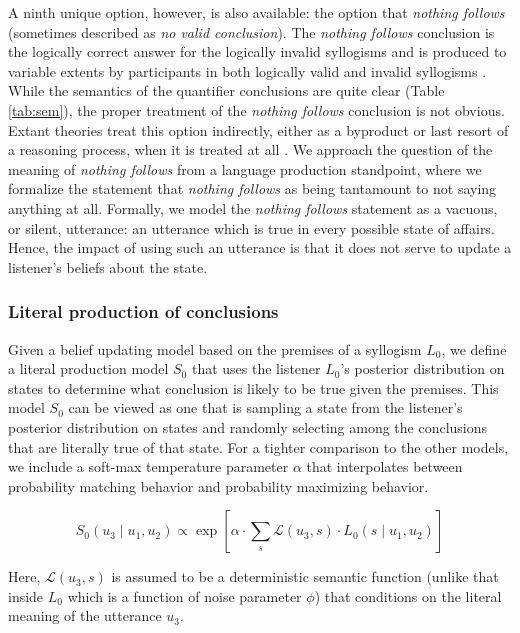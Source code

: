 \documentclass[floatsintext, man]{apa6}
\begin{document}
A ninth unique option, however, is also available: the option that \emph{nothing follows} (sometimes described as \emph{no valid conclusion}). 
The \emph{nothing follows} conclusion is the logically correct answer for the logically invalid syllogisms and is produced to variable extents by participants in both logically valid and invalid syllogisms \cite{Khemlani2012}.
While the semantics of the quantifier conclusions are quite clear (Table \ref{tab:sem}), the proper treatment of the \emph{nothing follows} conclusion is not obvious. 
Extant theories treat this option indirectly, either as a byproduct or last resort of a reasoning process, when it is treated at all \cite{ragni2019does, riesterer2020modeling}.
We approach the question of the meaning of \emph{nothing follows} from a language production standpoint, where we formalize the statement that \emph{nothing follows} as being tantamount to not saying anything at all. 
Formally, we model the \emph{nothing follows} statement as a vacuous, or silent, utterance: an utterance which is true in every possible state of affairs.
Hence, the impact of using such an utterance is that it does not serve to update a listener's beliefs about the state. 


\subsubsection{Literal production of conclusions}

Given a belief updating model based on the premises of a syllogism $L_0$, 
we define a literal production model $S_0$ that uses the listener $L_0$'s posterior distribution on states to determine what conclusion is likely to be true given the premises. 
This model $S_0$ can be viewed as one that is sampling a state from the listener's posterior distribution on states and randomly selecting among the conclusions that are literally true of that state. 
For a tighter comparison to the other models, we include a soft-max temperature parameter $\alpha$ that interpolates between probability matching behavior and probability maximizing behavior. 

\begin{equation}
S_0(u_3 \mid u_1, u_2) \propto \exp[ \alpha \cdot \sum_s \mathcal{L}(u_3, s) \cdot L_0(s \mid u_1, u_2)] \label{eq:R0}
\end{equation}

Here, $\mathcal{L}(u_3, s)$ is assumed to be a deterministic semantic function (unlike that inside $L_0$ which is a function of noise parameter $\phi$) that conditions on the literal meaning of the utterance $u_3$.
\end{document}
